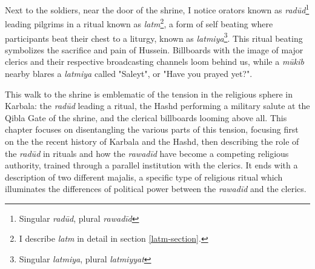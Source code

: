 Next to the soldiers, near the door of the shrine, I notice orators known as \emph{radūd}\footnote{Singular \emph{radūd}, plural \emph{rawadīd}} leading pilgrims in a ritual known as \emph{latm}\footnote{I describe \emph{latm} in detail in section \ref{latm-section}.}, a form of self beating where participants beat their chest to a liturgy, known as \emph{latmiya}\footnote{Singular \emph{latmiya}, plural \emph{latmiyyat}}. This ritual beating symbolizes the sacrifice and pain of Hussein. Billboards with the image of major clerics and their respective broadcasting channels loom behind us, while a \emph{mūkib} nearby blares a \emph{latmiya} called "Saleyt", or "Have you prayed yet?". 


This walk to the shrine is emblematic of the tension in the religious sphere in Karbala: the \emph{radūd} leading a ritual, the Hashd performing a military salute at the Qibla Gate of the shrine, and the clerical billboards looming above all. This chapter focuses on disentangling the various parts of this tension, focusing first on the the recent history of Karbala and the Hashd, then describing the role of the \emph{radūd} in rituals and how the \emph{rawadīd} have become a competing religious authority, trained through a parallel institution with the clerics. It ends with a description of two different majalis, a specific type of religious ritual which illuminates the differences of political power between the \emph{rawadīd} and the clerics. 




